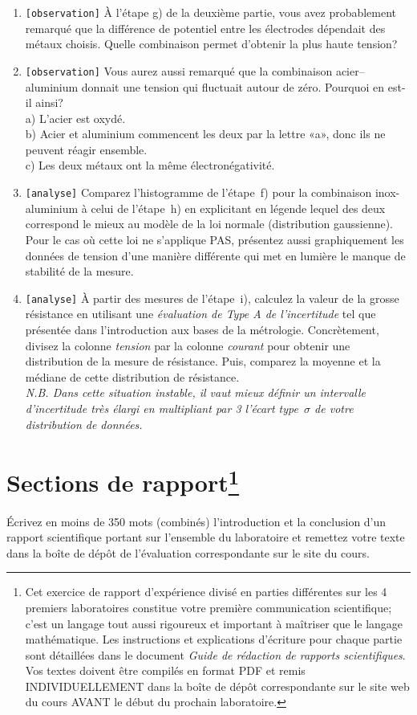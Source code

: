 \documentclass[canadien,12pt,oneside,letterpaper]{article}
\begin{document}
\begin{enumerate}
\item \texttt{[observation]} À l'étape g) de la deuxième partie, vous avez probablement remarqué que la différence de potentiel entre les électrodes dépendait des métaux choisis. Quelle combinaison permet d'obtenir la plus haute tension?
\item \texttt{[observation]} Vous aurez aussi remarqué que la combinaison acier--aluminium donnait une tension qui fluctuait autour de zéro. Pourquoi en est-il ainsi?\\a) L'acier est oxydé.\\b) Acier et aluminium commencent les deux par la lettre «a», donc ils ne peuvent réagir ensemble.\\c) Les deux métaux ont la même électronégativité.
\item \texttt{[analyse]} Comparez l’histogramme de l’étape~f) pour la combinaison inox-aluminium à celui de l’étape~h) en explicitant en légende lequel des deux correspond le mieux au modèle de la loi normale (distribution gaussienne). Pour le cas où cette loi ne s’applique PAS, présentez aussi graphiquement les données de tension d'une manière différente qui met en lumière le manque de stabilité de la mesure.
\item \texttt{[analyse]} À partir des mesures de l'étape~i), calculez la valeur de la grosse résistance en utilisant une \textit{évaluation de Type A de l'incertitude} tel que présentée dans l’introduction aux bases de la métrologie. Concrètement, divisez la colonne \textit{tension} par la colonne \textit{courant} pour obtenir une distribution de la mesure de résistance. Puis, comparez la moyenne et la médiane de cette distribution de résistance.\\ \textit{N.B. Dans cette situation instable, il vaut mieux définir un intervalle d'incertitude très élargi en multipliant par 3 l'écart type~$\sigma$ de votre distribution de données.}
\end{enumerate}

\section[]{Sections de rapport\footnote{Cet exercice de rapport d'expérience divisé en parties différentes sur les 4 premiers laboratoires constitue votre première communication scientifique; c'est un langage tout aussi rigoureux et important à maîtriser que le langage mathématique. Les instructions et explications d'écriture pour chaque partie sont détaillées dans le document \textit{Guide de rédaction de rapports scientifiques}. Vos textes doivent être compilés en format PDF et remis INDIVIDUELLEMENT dans la boîte de dépôt correspondante sur le site web du cours AVANT le début du prochain laboratoire.}}

Écrivez en moins de 350 mots (combinés) l'introduction et la conclusion d'un rapport scientifique portant sur l'ensemble du laboratoire et remettez votre texte dans la boîte de dépôt de l'évaluation correspondante sur le site du cours.
\end{document}
